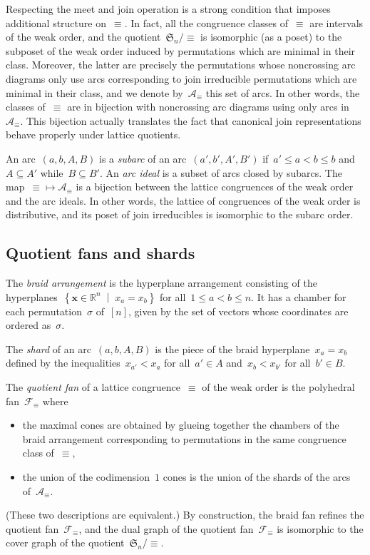 \documentclass{amsart}
\theoremstyle{definition}
\newcommand{\R}{\mathbb{R}} %
\renewcommand{\c}[1]{\mathcal{#1}} %
\renewcommand{\b}[1]{{\boldsymbol{#1}}} %
\newcommand{\f}[1]{\mathfrak{#1}} %
\newcommand{\set}[2]{\left\{ #1 \;\middle|\; #2 \right\}} %
\newcommand{\eqdef}{\mbox{\,\raisebox{0.2ex}{\scriptsize\ensuremath{\mathrm:}}\ensuremath{=}\,}} %
\newcommand{\darkblue}{\color{darkblue}} %
\newcommand{\defn}[1]{\textsl{\darkblue #1}} %
\begin{document}
Respecting the meet and join operation is a strong condition that imposes additional structure on~$\equiv$.
In fact, all the congruence classes of~$\equiv$ are intervals of the weak order, and the quotient~$\f{S}_n/{\equiv}$ is isomorphic (as a poset) to the subposet of the weak order induced by permutations which are minimal in their class.
Moreover, the latter are precisely the permutations whose noncrossing arc diagrams only use arcs corresponding to join irreducible permutations which are minimal in their class, and we denote by~$\c{A}_\equiv$ this set of arcs.
In other words, the classes of~$\equiv$ are in bijection with noncrossing arc diagrams using only arcs in~$\c{A}_\equiv$.
This bijection actually translates the fact that canonical join representations behave properly under lattice quotients.

An arc~$(a, b, A, B)$ is a \defn{subarc} of an arc~$(a', b', A', B')$ if~$a' \le a < b \le b$ and~$A \subseteq A'$ while~$B \subseteq B'$.
An \defn{arc ideal} is a subset of arcs closed by subarcs.
The map~${\equiv} \mapsto \c{A}_\equiv$ is a bijection between the lattice congruences of the weak order and the arc ideals.
In other words, the lattice of congruences of the weak order is distributive, and its poset of join irreducibles is isomorphic to the subarc order.

\subsection{Quotient fans and shards}

The \defn{braid arrangement} is the hyperplane arrangement consisting of the hyperplanes~$\set{\b{x} \in \R^n}{x_a = x_b}$ for all~$1 \le a < b \le n$.
It has a chamber for each permutation~$\sigma$ of~$[n]$, given by the set of vectors whose coordinates are ordered as~$\sigma$.

The \defn{shard} of an arc~$(a, b, A, B)$ is the piece of the braid hyperplane~${x_a = x_b}$ defined by the inequalities~$x_{a'} < x_a$ for all~$a' \in A$ and~$x_b < x_{b'}$ for all~$b' \in B$.

The \defn{quotient fan} of a lattice congruence~$\equiv$ of the weak order is the polyhedral fan~$\c{F}_\equiv$ where
\begin{itemize}
\item the maximal cones are obtained by glueing together the chambers of the braid arrangement corresponding to permutations in the same congruence class of~$\equiv$,
\item the union of the codimension~$1$ cones is the union of the shards of the arcs of~$\c{A}_\equiv$.
\end{itemize}
(These two descriptions are equivalent.)
By construction, the braid fan refines the quotient fan~$\c{F}_\equiv$, and the dual graph of the quotient fan~$\c{F}_\equiv$ is isomorphic to the cover graph of the quotient~$\f{S}_n/{\equiv}$.
\end{document}
